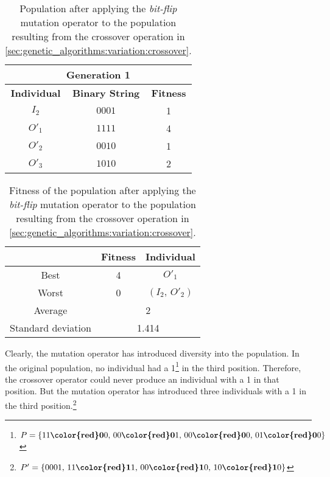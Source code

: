   \begin{table}[ht!]
    \centering
    \begin{tabular}{c | c | c }
      \multicolumn{3}{c}{\textbf{Generation 1}} \\
      \hline
      \hline
      \textbf{Individual} & \textbf{Binary String}  & \textbf{Fitness} \\
      \hline
      \(I_2\)             & \(0001\)                & 1 \\
      \(O'_1\)            & \(1111\)                & 4 \\
      \(O'_2\)            & \(0010\)                & 1 \\
      \(O'_3\)            & \(1010\)                & 2
    \end{tabular}
    \caption{
      Population after applying the \emph{bit-flip} mutation operator to the 
      population resulting from the crossover operation in 
      \vref{sec:genetic_algorithms:variation:crossover}.
    }
    \label{tab:genetic_algorithms:variation:mutation:2}
  \end{table}

  \begin{table}[H]
    \centering
    \begin{tabular}{|c|c|c|}
      \hline
            & \textbf{Fitness} & \textbf{Individual}  \\
      \hline
      Best  & 4 & \(O'_1\) \\
      Worst & 0 & \((I_2,\, O'_2)\) \\
      \hline
      \hline
      Average & \multicolumn{2}{c|}{2} \\
      \hline
      Standard deviation & \multicolumn{2}{c|}{1.414} \\
      \hline
    \end{tabular}
    \caption{
      Fitness of the population after applying the \emph{bit-flip} mutation 
      operator to the population resulting from the crossover operation in
      \vref{sec:genetic_algorithms:variation:crossover}.
    }
    \label{tab:genetic_algorithms:variation:mutation:fitness}
  \end{table}
 
  Clearly, the mutation operator has introduced diversity into the population.
  In the original population, no individual had a 1\footnote{
    \(P = \{
      11\textbf{{\color{red}0}}0,\, 
      00\textbf{{\color{red}0}}1,\, 
      00\textbf{{\color{red}0}}0,\, 
      01\textbf{{\color{red}0}}0
    \}\)
  } in the third position.
  Therefore, the crossover operator could never produce an individual with a 1 
  in that position.
  But the mutation operator has introduced three individuals with a 1 in the 
  third position.\footnote{
    \(P' = \{
      0001,\, 
      11\textbf{{\color{red}1}}1,\, 
      00\textbf{{\color{red}1}}0,\, 
      10\textbf{{\color{red}1}}0
    \}\)
  } 

